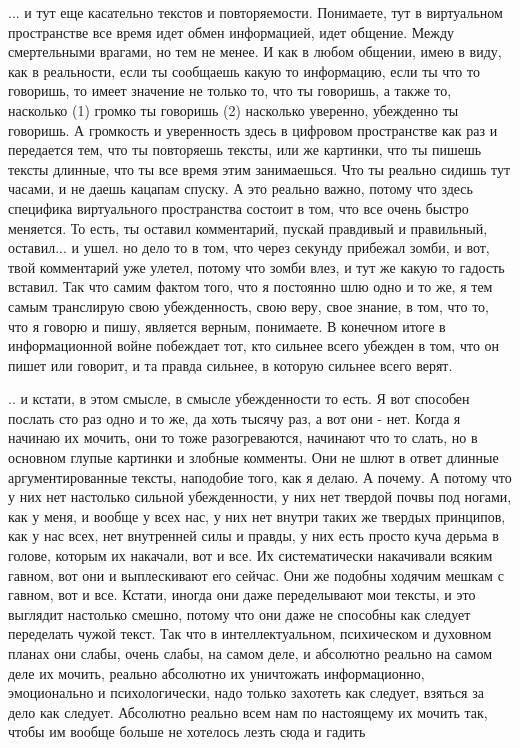 ... и тут еще касательно текстов и повторяемости. Понимаете, тут в виртуальном
пространстве все время идет обмен информацией, идет общение. Между смертельными
врагами, но тем не менее. И как в любом общении, имею в виду, как в реальности,
если ты сообщаешь какую то информацию, если ты что то говоришь, то имеет
значение не только то, что ты говоришь, а также то, насколько (1) громко ты
говоришь (2) насколько уверенно, убежденно ты говоришь. А громкость и
уверенность здесь в цифровом пространстве как раз и передается тем, что ты
повторяешь тексты, или же картинки, что ты пишешь тексты длинные, что ты все
время этим занимаешься. Что ты реально сидишь тут часами, и не даешь кацапам
спуску. А это реально важно, потому что здесь специфика виртуального
пространства состоит в том, что все очень быстро меняется. То есть, ты оставил
комментарий, пускай правдивый и правильный, оставил... и ушел. но дело то в
том, что через секунду прибежал зомби, и вот, твой комментарий уже улетел,
потому что зомби влез, и тут же какую то гадость вставил. Так что самим фактом
того, что я постоянно шлю одно и то же, я тем самым транслирую свою
убежденность, свою веру, свое знание, в том, что то, что я говорю и пишу,
является верным, понимаете. В конечном итоге в информационной войне побеждает
тот, кто сильнее всего убежден в том, что он пишет или говорит, и та правда
сильнее, в которую сильнее всего верят.

.. и кстати, в этом смысле, в смысле убежденности то есть. Я вот способен
послать сто раз одно и то же, да хоть тысячу раз, а вот они - нет. Когда я
начинаю их мочить, они то тоже разогреваются, начинают что то слать, но в
основном глупые картинки и злобные комменты. Они не шлют в ответ длинные
аргументированные тексты, наподобие того, как я делаю. А почему. А потому что у
них нет настолько сильной убежденности, у них нет твердой почвы под ногами, как
у меня, и вообще у всех нас, у них нет внутри таких же твердых принципов, как у
нас всех, нет внутренней силы и правды, у них есть просто куча дерьма в голове,
которым их накачали, вот и все. Их систематически накачивали всяким гавном, вот
они и выплескивают его сейчас. Они же подобны ходячим мешкам с гавном, вот и
все. Кстати, иногда они даже переделывают мои тексты, и это выглядит настолько
смешно, потому что они даже не способны как следует переделать чужой текст. Так
что в интеллектуальном, психическом и духовном планах они слабы, очень слабы,
на самом деле, и абсолютно реально на самом деле их мочить, реально абсолютно
их уничтожать информационно, эмоционально и психологически, надо только
захотеть как следует, взяться за дело как следует. Абсолютно реально всем нам
по настоящему их мочить так, чтобы им вообще больше не хотелось лезть сюда и
гадить

